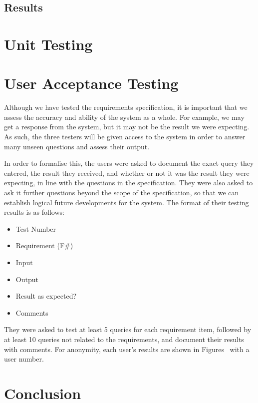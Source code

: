 \subsection{Results}
\label{subsec:requirementresults}

\section{Unit Testing}

\section{User Acceptance Testing}
Although we have tested the requirements specification, it is important that we assess the accuracy and ability of the system as a whole. For example, we may get a response from the system, but it may not be the result we were expecting. As such, the three testers will be given access to the system in order to answer many unseen questions and assess their output.

In order to formalise this, the users were asked to document the exact query they entered, the result they received, and whether or not it was the result they were expecting, in line with the questions in the specification. They were also asked to ask it further questions beyond the scope of the specification, so that we can establish logical future developments for the system. The format of their testing results is as follows:
\begin{itemize}
	\item Test Number
	\item Requirement (F\#)
	\item Input
	\item Output
	\item Result as expected?
	\item Comments
\end{itemize}
They were asked to test at least 5 queries for each requirement item, followed by at least 10 queries not related to the requirements, and document their results with comments. For anonymity, each user's results are shown in Figures~ with a user number.

\section{Conclusion}